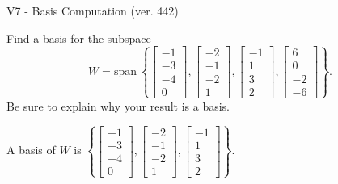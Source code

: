 \begin{exercise}
  \begin{exerciseTitle}V7 - Basis Computation (ver. 442)\end{exerciseTitle}
  \begin{exerciseStatement}
    Find a basis for the subspace 
\[W=\mathrm{span}\ \left\{\left[\begin{array}{r}
-1 \\
-3 \\
-4 \\
0
\end{array}\right] , \left[\begin{array}{r}
-2 \\
-1 \\
-2 \\
1
\end{array}\right] , \left[\begin{array}{r}
-1 \\
1 \\
3 \\
2
\end{array}\right] , \left[\begin{array}{r}
6 \\
0 \\
-2 \\
-6
\end{array}\right]\right\}.\]
 Be sure to explain why your result is a basis.


  \end{exerciseStatement}
  \begin{exerciseAnswer}
   A basis of \(W\) is  \(\left\{\left[\begin{array}{r}
-1 \\
-3 \\
-4 \\
0
\end{array}\right] , \left[\begin{array}{r}
-2 \\
-1 \\
-2 \\
1
\end{array}\right] , \left[\begin{array}{r}
-1 \\
1 \\
3 \\
2
\end{array}\right]\right\}\).
  


  \end{exerciseAnswer}
\end{exercise}